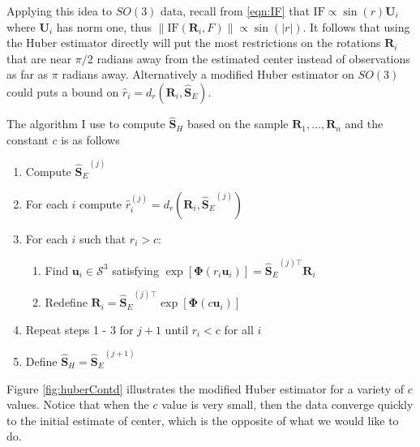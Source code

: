 \documentclass{article}\usepackage[]{graphicx}\usepackage[]{color}
\newcommand{\ProjMean}{{\widehat{\bm S}_{E}}}
\newcommand{\HuberMean}{{\widehat{\bm S}_H}}
\begin{document}
Applying this idea to $SO(3)$ data, recall from \eqref{eqn:IF} that $\text{IF}\propto\sin(r)\bm U_i$ where $\bm U_i$ has norm one, thus $\|\text{IF}(\bm R_i,F)\|\propto \sin(|r|)$.  It follows that using the Huber estimator directly will put the most restrictions on the rotations $\bm R_i$ that are near $\pi/2$ radians away from the estimated center instead of observations as far as $\pi$ radians away.  Alternatively a modified Huber estimator on $SO(3)$ could puts a bound on $\hat r_i=d_r(\bm R_i,\ProjMean)$.  

The algorithm I use to compute $\HuberMean$ based on the sample $\bm R_1,\dots,\bm R_n$ and the constant $c$ is as follows
\begin{enumerate} 
\item Compute $\ProjMean^{(j)}$
\item For each $i$ compute $\hat r_i^{(j)}=d_r(\bm R_i,\ProjMean^{(j)})$
\item For each $i$ such that $r_i>c$:
\begin{enumerate}
\item Find $\bm u_i\in\mathcal{S}^3$ satisfying $\exp[\bm{\Phi}(r_i\bm u_i)]=\ProjMean^{(j)\top}\bm R_i$
\item Redefine $\bm R_i=\ProjMean^{(j)\top}\exp[\bm{\Phi}(c\bm u_i)]$
\end{enumerate}
\item Repeat steps 1 - 3 for $j+1$ until $r_i<c$ for all $i$
\item Define $\HuberMean=\ProjMean^{(j+1)}$
\end{enumerate}
Figure \ref{fig:huberContd} illustrates the modified Huber estimator for a variety of $c$ values.  Notice that when the $c$ value is very small, then the data converge quickly to the initial estimate of center, which is the opposite of what we would like to do.

\end{document}
